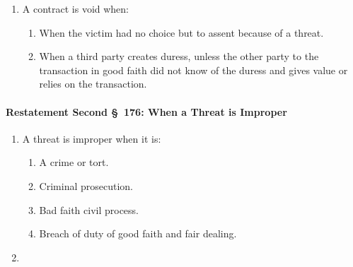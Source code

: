 \begin{enumerate}
    \item A contract is void when:
    \begin{enumerate}
        \item When the victim had no choice but to assent because of a threat.
        \item When a third party creates duress, unless the other party to the 
        transaction in good faith did not know of the duress and gives value 
        or relies on the transaction.
    \end{enumerate}
\end{enumerate}

\paragraph{Restatement Second \S\ 176: When a Threat is Improper}

\begin{enumerate}
    \item A threat is improper when it is:
    \begin{enumerate}
        \item A crime or tort.
        \item Criminal prosecution.
        \item Bad faith civil process.
        \item Breach of duty of good faith and fair dealing.
    \end{enumerate}
    \item %
\end{enumerate}

% 
% 
% 
% 
